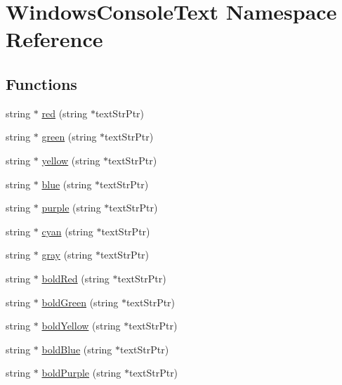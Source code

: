 \hypertarget{namespace_windows_console_text}{\section{Windows\-Console\-Text Namespace Reference}
\label{namespace_windows_console_text}
}
\subsection*{Functions}
\begin{DoxyCompactItemize}
\item 
string $\ast$ \hyperlink{namespace_windows_console_text_a0b3bd4d8c412a8208762be06cf2c7ddd}{red} (string $\ast$text\-Str\-Ptr)
\item 
string $\ast$ \hyperlink{namespace_windows_console_text_a3b5e5879c4a73adde641f69b9c5c692b}{green} (string $\ast$text\-Str\-Ptr)
\item 
string $\ast$ \hyperlink{namespace_windows_console_text_a13969e6a4cdad5b49196fb843585fef2}{yellow} (string $\ast$text\-Str\-Ptr)
\item 
string $\ast$ \hyperlink{namespace_windows_console_text_a7bbbf356662bad883f5e777a14c89ed8}{blue} (string $\ast$text\-Str\-Ptr)
\item 
string $\ast$ \hyperlink{namespace_windows_console_text_aff0abcf384e233f425332c77a07a45ac}{purple} (string $\ast$text\-Str\-Ptr)
\item 
string $\ast$ \hyperlink{namespace_windows_console_text_a4b1c94cd1e4282defb9baa7bf368fc64}{cyan} (string $\ast$text\-Str\-Ptr)
\item 
string $\ast$ \hyperlink{namespace_windows_console_text_a71de428c5c1012768568a554909ce21e}{gray} (string $\ast$text\-Str\-Ptr)
\item 
string $\ast$ \hyperlink{namespace_windows_console_text_a4e7b50f0fec313c7e650eb0a70012c3e}{bold\-Red} (string $\ast$text\-Str\-Ptr)
\item 
string $\ast$ \hyperlink{namespace_windows_console_text_aaec121e923f7ea5e3b7665c783044d1e}{bold\-Green} (string $\ast$text\-Str\-Ptr)
\item 
string $\ast$ \hyperlink{namespace_windows_console_text_ab12845c763ce135aaa1e45efb61f49d9}{bold\-Yellow} (string $\ast$text\-Str\-Ptr)
\item 
string $\ast$ \hyperlink{namespace_windows_console_text_a37e1e314abe02a10b3d55a66ba74c031}{bold\-Blue} (string $\ast$text\-Str\-Ptr)
\item 
string $\ast$ \hyperlink{namespace_windows_console_text_a0157e7ea4c376fd86f05764d8c1242a1}{bold\-Purple} (string $\ast$text\-Str\-Ptr)

\end{DoxyCompactItemize}
